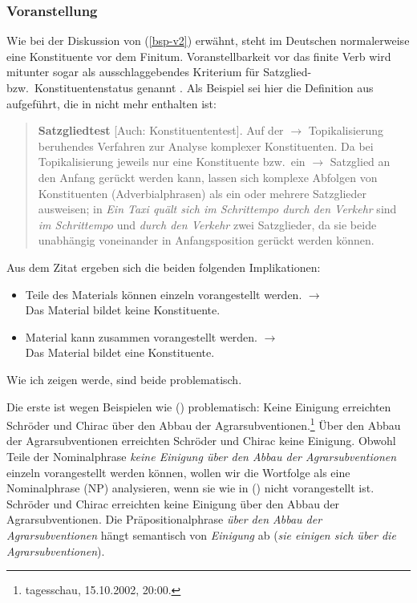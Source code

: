 



\subsubsection{Voranstellung}
\label{sec-konst-test-probleme-voranstellung} 

Wie bei der Diskussion von (\ref{bsp-v2}) erwähnt, steht im Deutschen normalerweise
eine Konstituente vor dem Finitum. Voranstellbarkeit vor das finite Verb wird mitunter
sogar als ausschlaggebendes Kriterium für Satzglied- bzw.\ Konstituentenstatus genannt \citep[]{Duden2005}. Als Beispiel sei hier die Definition aus  aufgeführt, die in
 nicht mehr enthalten ist:
\begin{quote}
\textbf{Satzgliedtest} [Auch: Konstituententest]. Auf der $\to$ Topikalisierung
beruhendes Verfahren zur Analyse komplexer Konstituenten. Da bei Topikalisierung
jeweils nur eine Konstituente bzw.\ ein $\to$ Satzglied an den Anfang gerückt werden kann,
lassen sich komplexe Abfolgen von Konstituenten (\zb Adverbialphrasen) als
ein oder mehrere Satzglieder ausweisen; in \textit{Ein Taxi quält sich im Schrittempo
durch den Verkehr} sind \textit{im Schrittempo} und \textit{durch den Verkehr}
zwei Satzglieder, da sie beide unabhängig voneinander in Anfangsposition gerückt werden
können. \citep[]{Bussmann83a}
\end{quote}

Aus dem Zitat ergeben sich die beiden folgenden Implikationen:
\begin{itemize}
\item Teile des Materials können einzeln vorangestellt werden. $\to$\\
      Das Material bildet keine Konstituente.
\item Material kann zusammen vorangestellt werden. $\to$\\
      Das Material bildet eine Konstituente.
\end{itemize}
Wie ich zeigen werde, sind beide problematisch.

Die erste ist wegen Beispielen wie () problematisch:
\eal
\ex Keine Einigung erreichten Schröder und Chirac über den Abbau der Agrarsubventionen.\footnote{tagesschau, 15.10.2002, 20:00.}
\ex Über den Abbau der Agrarsubventionen erreichten Schröder und Chirac keine Einigung.
\zl
Obwohl Teile der Nominalphrase \emph{keine Einigung über den Abbau der Agrarsubventionen}
einzeln vorangestellt werden können, wollen wir die Wortfolge als eine Nominalphrase (NP) analysieren,
wenn sie wie in () nicht vorangestellt ist.
\ea
Schröder und Chirac erreichten keine Einigung über den Abbau der Agrarsubventionen.
\z
Die Präpositionalphrase \emph{über den Abbau der Agrarsubventionen} hängt semantisch von \emph{Einigung}
ab (\emph{sie einigen sich über die Agrarsubventionen}).

